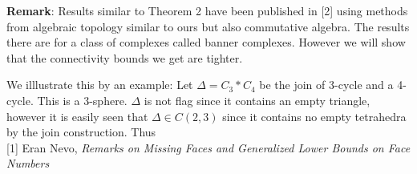 \documentclass[a4paper]{article}
\begin{document}
{\textbf{Remark}: Results similar to Theorem 2 have been published in [2] using methods from algebraic topology similar to ours but also commutative algebra.  The results there are for a class of complexes called banner complexes. However we will show that the connectivity bounds we get are tighter. 

We illlustrate this by an example: Let $\Delta = C_3 * C_4$ be the join of 3-cycle and a 4-cycle. This is a 3-sphere. $\Delta$ is not flag since it contains an empty triangle, however it is easily seen that $\Delta \in C(2, 3)$ since it contains no empty tetrahedra by the join construction.  Thus \\


[1] Eran Nevo, \textit{Remarks on Missing Faces and Generalized Lower
Bounds on Face Numbers}





}
\end{document}

